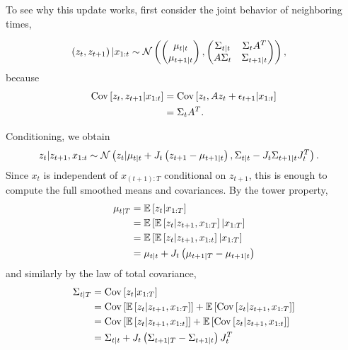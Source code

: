\documentclass[14pt]{extreport}
\begin{document}
To see why this update works, first consider the joint behavior of neighboring
times,

\begin{align*}
   \left(z_{t}, z_{t + 1}\right) \vert x_{1:t} &\sim \mathcal{N}\left(
\begin{pmatrix}
  \mu_{t \vert t} \\
  \mu_{t + 1 \vert t}
\end{pmatrix},
\begin{pmatrix}
  \Sigma_{t \vert t} & \Sigma_{t} A^{T} \\
  A \Sigma_{t} & \Sigma_{t + 1 \vert t}
\end{pmatrix}\right),
\end{align*}
because
\begin{align*}
  \mathrm{Cov}\left[{z_{t}, z_{t + 1} \vert x_{1:t}}\right] &= \mathrm{Cov}\left[{z_{t}, Az_{t} + \epsilon_{t + 1} \vert x_{1:t}}\right] \\
  &= \Sigma_{t}A^{T}.
\end{align*}

Conditioning, we obtain
\begin{align*}
  z_{t} \vert z_{t + 1}, x_{1:t} &\sim \mathcal{N}\left(
  z_{t} \vert \mu_{t \vert t} + J_{t}\left(z_{t + 1} - \mu_{t + 1 \vert t}\right),
  \Sigma_{t \vert t} - J_{t} \Sigma_{t + 1 \vert t} J_{t}^{T}
  \right).
\end{align*}
Since $x_{t}$ is independent of $x_{(t + 1): T}$ conditional on $z_{t + 1}$,
this is enough to compute the full smoothed means and covariances. By the tower
property,
\begin{align*}
  \mu_{t \vert T} &= \mathbb{E}\left[{z_{t} \vert x_{1:T}}\right] \\
  &= \mathbb{E}\left[{\mathbb{E}\left[{z_{t} \vert z_{t + 1}, x_{1 : T}}\right] \vert x_{1:T}}\right] \\
  &= \mathbb{E}\left[{\mathbb{E}\left[{z_{t} \vert z_{t + 1}, x_{1:t}}\right] \vert x_{1:T}}\right] \\
  &= \mu_{t \vert t} + J_{t}\left(\mu_{t + 1 \vert T} - \mu_{t + 1 \vert t}\right)
\end{align*}
and similarly by the law of total covariance,
\begin{align*}
  \Sigma_{t\vert T} &= \mathrm{Cov}\left[{z_{t} \vert x_{1:T}}\right] \\
  &= \mathrm{Cov}\left[{\mathbb{E}\left[{z_{t} \vert z_{t + 1}, x_{1:T}}\right]}\right] + \mathbb{E}\left[{\mathrm{Cov}\left[{z_{t} \vert z_{t + 1}, x_{1:T}}\right]}\right] \\
  &= \mathrm{Cov}\left[{\mathbb{E}\left[{z_{t} \vert z_{t + 1}, x_{1:t}}\right]}\right] + \mathbb{E}\left[{\mathrm{Cov}\left[{z_{t} \vert z_{t + 1}, x_{1:t}}\right]}\right] \\
  &= \Sigma_{t \vert t} + J_{t}\left(\Sigma_{t + 1 \vert T} - \Sigma_{t + 1 \vert t}\right) J_{t}^{T}
\end{align*}
\end{document}
